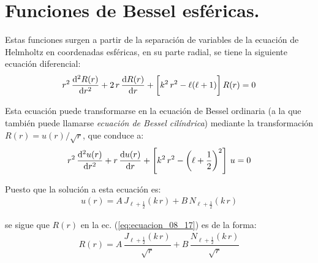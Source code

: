\section{Funciones de Bessel esféricas.}
Estas funciones surgen a partir de la separación de variables de la ecuación de Helmholtz en coordenadas esféricas, en su parte radial, se tiene la siguiente ecuación diferencial:
\begin{align}
r^{2} \, \dv[2]{R(r)}{r} + 2 \, r \, \dv{R(r)}{r} + \bigg[ k^{2} \, r^{2} - \ell (\ell + 1) \bigg] \, R(r) = 0
\label{eq:ecuacion_08_17}
\end{align}

Esta ecuación puede transformarse en la ecuación de Bessel ordinaria (a la que también puede llamarse \emph{ecuación de Bessel cilíndrica}) mediante la transformación $R(r) = u(r) /\sqrt{r}$, que conduce a:
\begin{align*}
r^{2} \, \dv[2]{u(r)}{r} + r \, \dv{u(r)}{r} + \left[ k^{2} \, r^{2} -  \left( \ell + \dfrac{1}{2} \right)^{2} \right] \, u = 0
\end{align*}

Puesto que la solución a esta ecuación es:
\begin{align*}
u(r) = A \, J_{\ell+\frac{1}{2}} (k \, r) + B \, N_{\ell+\frac{1}{2}} (k \, r)
\end{align*}

se sigue que $R(r)$ en la ec. (\ref{eq:ecuacion_08_17}) es de la forma:
\begin{align*}
R(r) = A \, \dfrac{J_{\ell+\frac{1}{2}} (k \, r)}{\sqrt{r}} + B \, \dfrac{N_{\ell+\frac{1}{2}} (k \, r)}{\sqrt{r}}  \end{align*}

